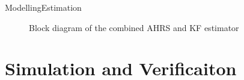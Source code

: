\documentclass[10pt,handout]{beamer}
\begin{document}
\begin{frame}{Modelling}{Estimation}
  \begin{figure}
    {\tiny }
	  \caption{\scriptsize Block diagram of the combined AHRS and KF estimator}
  \end{figure}
\end{frame}

\section{Simulation and Verificaiton}

%
%
\end{document}
